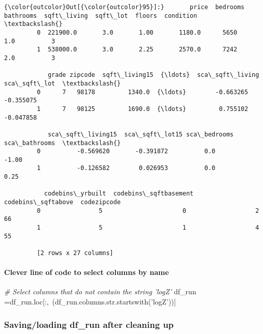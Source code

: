 \documentclass[11pt]{article}
\newenvironment{Shaded}{}{}
\newcommand{\StringTok}[1]{\textcolor[rgb]{0.25,0.44,0.63}{{#1}}}
\newcommand{\CommentTok}[1]{\textcolor[rgb]{0.38,0.63,0.69}{\textit{{#1}}}}
\newcommand{\NormalTok}[1]{{#1}}
\newcommand{\OperatorTok}[1]{\textcolor[rgb]{0.40,0.40,0.40}{{#1}}}
\newcommand{\BuiltInTok}[1]{{#1}}
\begin{document}
\begin{Verbatim}[commandchars=\\\{\}]
{\color{outcolor}Out[{\color{outcolor}95}]:}       price  bedrooms  bathrooms  sqft\_living  sqft\_lot  floors  condition  \textbackslash{}
         0  221900.0       3.0       1.00       1180.0      5650     1.0          3   
         1  538000.0       3.0       2.25       2570.0      7242     2.0          3   
         
            grade zipcode  sqft\_living15  {\ldots}  sca\_sqft\_living  sca\_sqft\_lot  \textbackslash{}
         0      7   98178         1340.0  {\ldots}        -0.663265     -0.355075   
         1      7   98125         1690.0  {\ldots}         0.755102     -0.047858   
         
            sca\_sqft\_living15  sca\_sqft\_lot15 sca\_bedrooms sca\_bathrooms  \textbackslash{}
         0          -0.569620       -0.391872          0.0         -1.00   
         1          -0.126582        0.026953          0.0          0.25   
         
           codebins\_yrbuilt  codebins\_sqftbasement  codebins\_sqftabove  codezipcode  
         0                5                      0                   2           66  
         1                5                      1                   4           55  
         
         [2 rows x 27 columns]
\end{Verbatim}
            
    \hypertarget{clever-line-of-code-to-select-columns-by-name}{%
\paragraph{Clever line of code to select columns by
name}\label{clever-line-of-code-to-select-columns-by-name}}

\begin{Shaded}
\begin{Highlighting}[]
\CommentTok{# Select columns that do not contain the string 'logZ'}
\NormalTok{df_run }\OperatorTok{=}\NormalTok{df_run.loc[:,}\OperatorTok{~}\NormalTok{(df_run.columns.}\BuiltInTok{str}\NormalTok{.startswith(}\StringTok{'logZ'}\NormalTok{))]}
\end{Highlighting}
\end{Shaded}

    \hypertarget{savingloading-df_run-after-cleaning-up}{%
\subsubsection{Saving/loading df\_run after cleaning
up}\label{savingloading-df_run-after-cleaning-up}}
\end{document}
